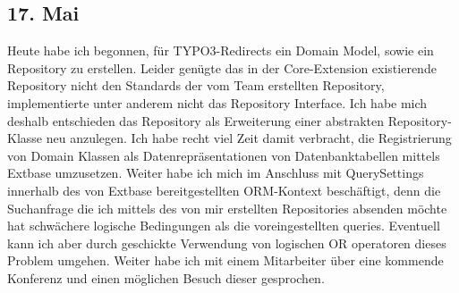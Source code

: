 \subsection{17. Mai}
Heute habe ich begonnen, für TYPO3-Redirects ein Domain Model, sowie ein Repository zu erstellen. Leider genügte das in der Core-Extension existierende Repository nicht den Standards der vom Team erstellten Repository, implementierte unter anderem nicht das Repository Interface. Ich habe mich deshalb entschieden das Repository als Erweiterung einer abstrakten Repository-Klasse neu anzulegen. Ich habe recht viel Zeit damit verbracht, die Registrierung von Domain Klassen als Datenrepräsentationen von Datenbanktabellen mittels Extbase umzusetzen. Weiter habe ich mich im Anschluss mit QuerySettings innerhalb des von Extbase bereitgestellten ORM-Kontext beschäftigt, denn die Suchanfrage die ich mittels des von mir erstellten Repositories absenden möchte hat schwächere logische Bedingungen als die voreingestellten queries. Eventuell kann ich aber durch geschickte Verwendung von logischen OR operatoren dieses Problem umgehen. Weiter habe ich mit einem Mitarbeiter über eine kommende Konferenz und einen möglichen Besuch dieser gesprochen.